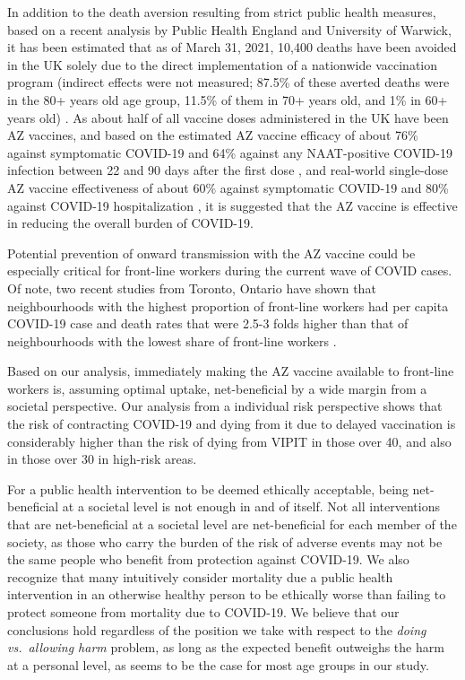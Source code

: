 \documentclass[]{interact}
\theoremstyle{plain}%
\theoremstyle{definition}
\theoremstyle{remark}
\begin{document}
In addition to the death aversion resulting from strict public health
measures, based on a recent analysis by Public Health England and
University of Warwick, it has been estimated that as of March 31, 2021,
10,400 deaths have been avoided in the UK solely due to the direct
implementation of a nationwide vaccination program (indirect effects
were not measured; 87.5\% of these averted deaths were in the 80+ years
old age group, 11.5\% of them in 70+ years old, and 1\% in 60+ years
old) \citep{public_health_england_impact_2021}. As about half of all
vaccine doses administered in the UK have been AZ vaccines, and based on
the estimated AZ vaccine efficacy of about 76\% against symptomatic
COVID-19 and 64\% against any NAAT-positive COVID-19 infection between
22 and 90 days after the first dose \citep{voysey_single-dose_2021}, and
real-world single-dose AZ vaccine effectiveness of about 60\% against
symptomatic COVID-19 and 80\% against COVID-19 hospitalization
\citep{public_health_england_1public_2021}, it is suggested that the AZ
vaccine is effective in reducing the overall burden of COVID-19.

Potential prevention of onward transmission with the AZ vaccine could be
especially critical for front-line workers during the current wave of
COVID cases. Of note, two recent studies from Toronto, Ontario have
shown that neighbourhoods with the highest proportion of front-line
workers had per capita COVID-19 case and death rates that were 2.5-3
folds higher than that of neighbourhoods with the lowest share of
front-line workers
\citep[\citet{rao_disproportionate_2021}]{chagla_characterizing_2021}.

Based on our analysis, immediately making the AZ vaccine available to
front-line workers is, assuming optimal uptake, net-beneficial by a wide
margin from a societal perspective. Our analysis from a individual risk
perspective shows that the risk of contracting COVID-19 and dying from
it due to delayed vaccination is considerably higher than the risk of
dying from VIPIT in those over 40, and also in those over 30 in
high-risk areas.

For a public health intervention to be deemed ethically acceptable,
being net-beneficial at a societal level is not enough in and of itself.
Not all interventions that are net-beneficial at a societal level are
net-beneficial for each member of the society, as those who carry the
burden of the risk of adverse events may not be the same people who
benefit from protection against COVID-19. We also recognize that many
intuitively consider mortality due a public health intervention in an
otherwise healthy person to be ethically worse than failing to protect
someone from mortality due to COVID-19. We believe that our conclusions
hold regardless of the position we take with respect to the \emph{doing
vs.~allowing harm} problem\citep{woollard_doing_2016}, as long as the
expected benefit outweighs the harm at a personal level, as seems to be
the case for most age groups in our study.
\end{document}
